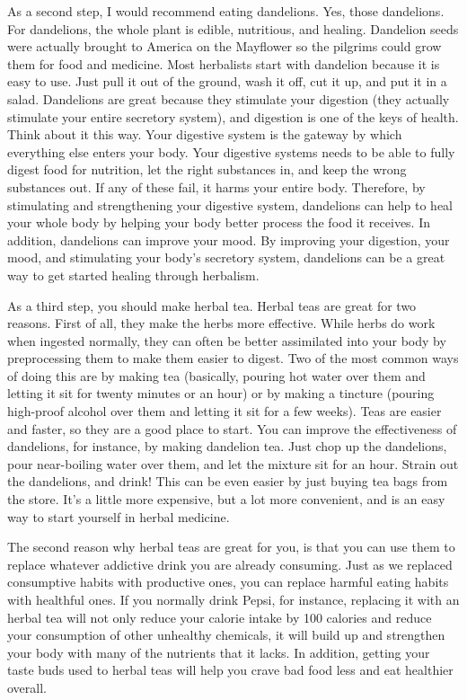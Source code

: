 As a second step, I would recommend eating dandelions. Yes, those
dandelions. For dandelions, the whole plant is edible, nutritious, and
healing.  Dandelion seeds were actually brought to America on the
Mayflower so the pilgrims could grow them for food and medicine.  Most
herbalists start with dandelion because it is easy to use. Just pull it
out of the ground, wash it off, cut it up, and put it in a salad.
Dandelions are great because they stimulate your digestion (they
actually stimulate your entire secretory system), and digestion is one
of the keys of health. Think about it this way. Your digestive system
is the gateway by which everything else enters your body. Your
digestive systems needs to be able to fully digest food for nutrition,
let the right substances in, and keep the wrong substances out. If any
of these fail, it harms your entire body. Therefore, by stimulating and
strengthening your digestive system, dandelions can help to heal your
whole body by helping your body better process the food it receives. In
addition, dandelions can improve your mood. By improving your
digestion, your mood, and stimulating your body's
secretory system, dandelions can be a great way to get started healing
through herbalism.

As a third step, you should make herbal tea. Herbal teas are great
for two reasons.  First of all, they make the herbs more effective.
While herbs do work when  
ingested normally, they can often be better assimilated into your body
by preprocessing them to make them easier to digest. Two of the most
common ways of doing this are by making tea (basically, pouring hot
water over them and letting it sit for twenty minutes or an hour) or by
making a tincture (pouring high-proof alcohol over them and letting it sit for a
few weeks). Teas are easier and faster, so they are a good place to
start. You can improve the effectiveness of dandelions, for instance, 
by making dandelion tea. Just chop up the dandelions, pour near-boiling water
over them, and let the mixture sit for an hour. Strain out the
dandelions, and drink!  This can be even easier by just buying 
tea bags from the store.  It's a little more expensive, but a lot more
convenient, and is an easy way to start yourself in herbal medicine.

The second reason why herbal teas are great for you, is that you can
use them to replace whatever addictive drink you are already consuming.
Just as we replaced consumptive habits with productive ones, you can
replace harmful eating habits with healthful ones.  If you normally
drink Pepsi, for instance, replacing it with an herbal tea will not
only reduce your calorie intake by 100 calories and reduce your 
consumption of other unhealthy chemicals, it will build up and strengthen
your body with many of the nutrients that it lacks.  In addition,
getting your taste buds used to herbal teas will help you crave bad food
less and eat healthier overall.

